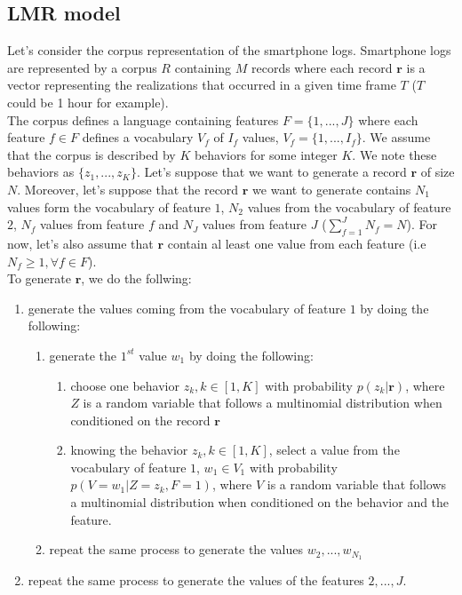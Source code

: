 \subsection{LMR model}

Let's consider the corpus representation of the smartphone logs. Smartphone logs are represented by a corpus $R$ containing $\mathit{M}$ records where each record $\mathbf{r}$ is a vector representing the realizations that occurred in a given time frame $\mathit{T}$ ($\mathit{T}$ could be 1 hour for example).
\\The corpus defines a language containing features $F=\{1,...,J\}$ where each feature $f\in F$ defines a vocabulary $V_{f}$ of $I_{f}$ values, $V_{f}=\{1,...,I_{f}\}$. We assume that the corpus is described by $K$ behaviors for some integer $K$. We note these behaviors as $\{z_{1},...,z_{K}\}$. Let's suppose that we want to generate a record $\mathbf{r}$ of size $N$. Moreover, let's suppose that the record $\mathbf{r}$ we want to generate contains $N_{1}$ values form the vocabulary of feature $1$, $N_{2}$ values from the vocabulary of feature $2$, $N_{f}$ values from feature $f$ and $N_{J}$ values from feature $J$ ($\sum_{f=1}^{J}N_{f}=N$). For now, let's also assume that $\mathbf{r}$ contain al least one value from each feature (i.e $N_{f}\geq 1,\forall f\in F$).
\\To generate $\mathbf{r}$, we do the follwing:
\begin{enumerate} 
	\item generate the values coming from the vocabulary of feature $1$ by doing the following:
	 	\begin{enumerate}
		 	\item generate the $1^{st}$ value $w_1$ by doing the following:
	 		 	\begin{enumerate}
		 			\item choose one behavior $z_{k},k\in [1,K]$ with probability $p(z_{k}|\mathbf{r})$, where $Z$ is a random variable that follows a multinomial distribution when conditioned on the record $\mathbf{r}$
		 			\item knowing the behavior $z_{k},k\in [1,K]$, select a value from the vocabulary of feature $1$, $w_{1} \in V_{1}$ with probability $p(V=w_{1}|Z=z_{k},F=1)$, where $V$ is a random variable that follows a 							multinomial distribution when conditioned on the behavior and the feature.
		 		\end{enumerate}
			\item repeat the same process to generate the values $w_{2},...,w_{N_{1}}$
		\end{enumerate} 
	\item repeat the same process to generate the values of the features $2,...,J$. 
\end{enumerate} \par
